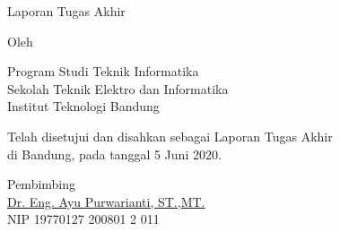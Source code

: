 \clearpage
\pagestyle{empty}
\begin{center}
\smallskip

    \Large \bfseries \MakeUppercase{\thetitle}
    \vfill

    \Large Laporan Tugas Akhir
    \vfill

    \large Oleh

    \Large \theauthor

    \large Program Studi Teknik Informatika \\
    \normalsize \normalfont Sekolah Teknik Elektro dan Informatika \\
    Institut Teknologi Bandung \\

    \vfill
    \normalsize \normalfont{
        
    }
    
    Telah disetujui dan disahkan sebagai Laporan Tugas Akhir \\
    di Bandung, pada tanggal 5 Juni 2020.

    \vfill
    \normalsize \normalfont
    Pembimbing\\
    \vfill
    \underline{Dr. Eng. Ayu Purwarianti, ST.,MT.} \\
    NIP 19770127 200801 2 011


\end{center}
\restoregeometry
\clearpage
